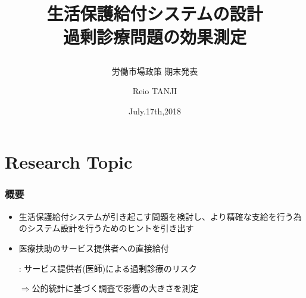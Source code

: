 \documentclass[dvipdfmx,14pt]{beamer}
\title{生活保護給付システムの設計 \\ 過剰診療問題の効果測定
\subtitle{労働市場政策 期末発表}}
\author{Reio TANJI}
\date{July.17th,2018}
\institute{Osaka University}
\begin{document}
\begin{frame}\frametitle{}
\titlepage
\end{frame}

\section{Research Topic}
\begin{frame}\frametitle{概要}

 \begin{itemize}
 
 \item 生活保護給付システムが引き起こす問題を検討し、より精確な支給を行う為のシステム設計を行うためのヒントを引き出す
 
 \item 医療扶助のサービス提供者への直接給付
 
 : サービス提供者(医師)による過剰診療のリスク
 
 $\Rightarrow$公的統計に基づく調査で影響の大きさを測定
 
 \end{itemize}

\end{frame}
\end{document}
